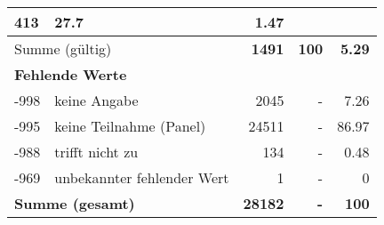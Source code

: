 \begin{longtable}{lXrrr}
       \num{413} &
       \num[round-mode=places,round-precision=2]{27,7} &
         \num[round-mode=places,round-precision=2]{1,47} \\
     \midrule
     \multicolumn{2}{l}{Summe (gültig)} &
       \textbf{\num{1491}} &
     \textbf{100} &
       \textbf{\num[round-mode=places,round-precision=2]{5,29}} \\
     \multicolumn{5}{l}{\textbf{Fehlende Werte}}\\
       -998 &
       keine Angabe &
         \num{2045} &
        - &
         \num[round-mode=places,round-precision=2]{7,26} \\
       -995 &
       keine Teilnahme (Panel) &
         \num{24511} &
        - &
         \num[round-mode=places,round-precision=2]{86,97} \\
       -988 &
       trifft nicht zu &
         \num{134} &
        - &
         \num[round-mode=places,round-precision=2]{0,48} \\
       -969 &
       unbekannter fehlender Wert &
         \num{1} &
        - &
         \num[round-mode=places,round-precision=2]{0} \\
     \midrule
     \multicolumn{2}{l}{\textbf{Summe (gesamt)}} &
          \textbf{\num{28182}} &
        \textbf{-} &
        \textbf{100} \\
     \bottomrule
     \end{longtable}
     
